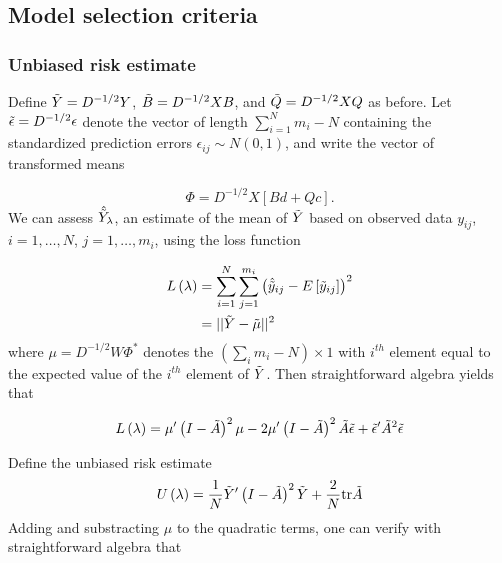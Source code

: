 \subsection{Model selection criteria}
\subsubsection{Unbiased risk estimate}

Define  $\tilde{Y} = D^{-1/2} Y$, $\tilde{B} = D^{-1/2} X B $, and $\tilde{Q} = D^{-1/2} X Q$ as before. Let $\tilde{\epsilon} = D^{-1/2} \epsilon$ denote the vector of length  $\sum_{i = 1}^Nm_i - N$ containing the standardized prediction errors $\epsilon_{ij} \sim N\left(0,1\right)$, and write the vector of transformed means 

\begin{equation} 
\Phi = D^{-1/2} X \left[ Bd + Qc \right].
\end{equation}
\noindent
We can assess $\hat{\tilde{Y}}_\lambda$, an estimate of the mean of $\tilde{Y}$ based on observed data $y_{ij}$, $i = 1,\dots, N$, $j = 1,\dots, m_i$, using the loss function

\begin{align}
\begin{split}
L\left(\lambda\right) &= \sum_{i = 1}^N \sum_{j = 1}^{m_i} \left(\hat{\tilde{y}}_{ij} - E\left[\tilde{y}_{ij}\right] \right)^2\\
&= \vert \vert \tilde{Y} - \tilde{\mu} \vert \vert^2
\end{split}
\end{align}
\noindent
where $\mu = D^{-1/2}W \Phi^*$ denotes the $\left( \sum \limits_{i} m_i - N\right) \times 1$ with $i^{th}$ element equal to the expected value of the  $i^{th}$ element of $\tilde{Y}$.  Then straightforward algebra yields that 

\begin{align} 
L\left(\lambda\right) = \mu'\left( I - \tilde{A} \right)^2\mu - 2\mu'\left( I - \tilde{A} \right)^2 \tilde{A} \tilde{\epsilon} + \tilde{\epsilon}' \tilde{A}^2 \tilde{\epsilon}
\end{align}

Define the unbiased risk estimate
\begin{equation} 
U\left(\lambda\right) = \frac{1}{N}\tilde{Y}'\left( I - \tilde{A} \right)^2\tilde{Y} + \frac{2}{N}\mbox{tr}\tilde{A}
\end{equation}
 \noindent
Adding and substracting $\mu$ to the quadratic terms, one can verify with straightforward algebra that

